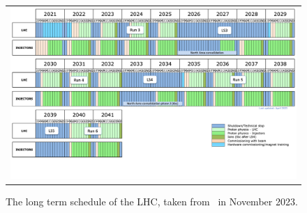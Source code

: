 \begin{figure}[tbh!]
 \begin{center}
 \begin{tabular}{c}
 \includegraphics[width=\textwidth]{figures/Part2/LHC/Schedule}
 \end{tabular}
 \caption{The long term schedule of the \ac{LHC}, taken from~\cite{LHC:plan} in November 2023.}
 \label{fig:Schedule}
 \end{center}
\end{figure}